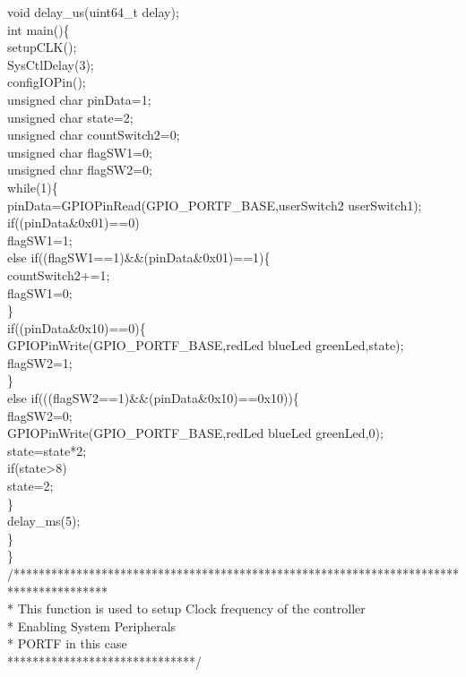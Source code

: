 \documentclass[a4paper,10pt,oneside]{article}
\begin{document}
{		void delay\_us(uint64\_t delay);\\
		int main()\{\\
			setupCLK();\\
			SysCtlDelay(3);\\
			configIOPin();\\
			unsigned char pinData=1;\\
			unsigned char state=2;\\
			unsigned char countSwitch2=0;\\
			unsigned char flagSW1=0;\\
			unsigned char flagSW2=0;\\
			while(1)\{\\
				pinData=GPIOPinRead(GPIO\_PORTF\_BASE,userSwitch2 \vert userSwitch1);\\
				if((pinData\&0x01)==0)\\
				flagSW1=1;\\
				else if((flagSW1==1)\&\&(pinData\&0x01)==1)\{\\
					countSwitch2+=1;\\
					flagSW1=0;\\
				\}\\
				if((pinData\&0x10)==0)\{\\
					GPIOPinWrite(GPIO\_PORTF\_BASE,redLed \vert blueLed \vert greenLed,state);\\
					flagSW2=1;\\
				\}\\
				else if(((flagSW2==1)\&\&(pinData\&0x10)==0x10))\{\\
					flagSW2=0;\\
					GPIOPinWrite(GPIO\_PORTF\_BASE,redLed \vert blueLed \vert greenLed,0);\\
					state=state*2;\\
					if(state>8)\\
					state=2;\\
				\}\\
				delay\_ms(5);\\
			\}\\
		\}\\
		/***************************************************************************************\\
		* This function is used to setup Clock frequency of the controller\\
		* Enabling System Peripherals\\
		* PORTF in this case\\
		******************************/\\
}
\end{document}
